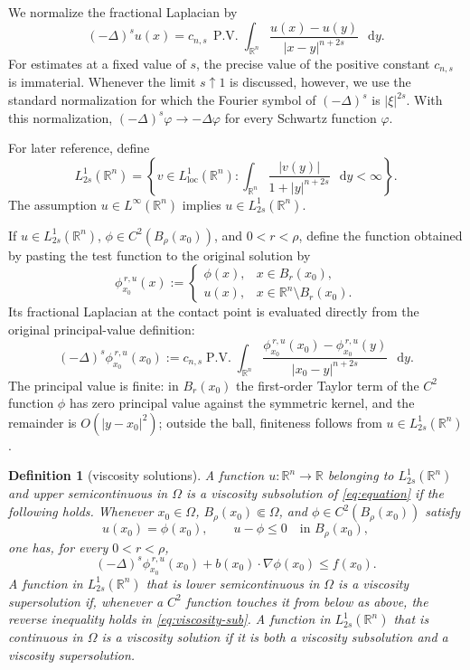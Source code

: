 \documentclass[10pt,a4paper]{amsart}
\numberwithin{equation}{section}
\newtheorem{definition}[theorem]{Definition}
\newcommand{\R}{\mathbb R}
\newcommand{\differential}{\mathop{}\!\mathrm d}
\begin{document}
We normalize the fractional Laplacian by
\begin{equation}\label{eq:frac-lap}
 (-\Delta)^s u(x)=c_{n,s}\,\operatorname{P.V.}
 \int_{\R^n}\frac{u(x)-u(y)}{|x-y|^{n+2s}}\,\differential y.
\end{equation}
For estimates at a fixed value of $s$, the precise value of the positive
constant $c_{n,s}$ is immaterial.  Whenever the limit $s\uparrow1$ is
discussed, however, we use the standard normalization for which the Fourier
symbol of $(-\Delta)^s$ is $|\xi|^{2s}$.  With this normalization,
$(-\Delta)^s\varphi\to-\Delta\varphi$ for every Schwartz function
$\varphi$.

For later reference, define
\[
 L^1_{2s}(\R^n)=\left\{v\in L^1_{\mathrm{loc}}(\R^n):
 \int_{\R^n}\frac{|v(y)|}{1+|y|^{n+2s}}\,\differential y<\infty\right\}.
\]
The assumption $u\in L^\infty(\R^n)$ implies $u\in L^1_{2s}(\R^n)$.

If $u\in L^1_{2s}(\R^n)$, $\phi\in C^2(B_\rho(x_0))$, and
$0<r<\rho$, define the function obtained by pasting the test function to
the original solution by
\begin{equation}\label{eq:pasted-test}
 \phi^{\,r,u}_{x_0}(x):=
 \begin{cases}
  \phi(x),&x\in B_r(x_0),\\
  u(x),&x\in\R^n\setminus B_r(x_0).
 \end{cases}
\end{equation}
Its fractional Laplacian at the contact point is evaluated directly from
the original principal-value definition:
\begin{equation}\label{eq:pasted-fractional-laplacian}
 (-\Delta)^s\phi^{\,r,u}_{x_0}(x_0)
 :=c_{n,s}\operatorname{P.V.}\int_{\R^n}
 \frac{\phi^{\,r,u}_{x_0}(x_0)-\phi^{\,r,u}_{x_0}(y)}
 {|x_0-y|^{n+2s}}\,\differential y.
\end{equation}
The principal value is finite: in $B_r(x_0)$ the first-order Taylor term
of the $C^2$ function $\phi$ has zero principal value against the symmetric
kernel, and the remainder is $O(|y-x_0|^2)$; outside the ball, finiteness
follows from $u\in L^1_{2s}(\R^n)$.

\begin{definition}[viscosity solutions]\label{def:viscosity}
A function $u:\R^n\to\R$ belonging to $L^1_{2s}(\R^n)$ and upper
semicontinuous in $\Omega$ is a viscosity
subsolution of \eqref{eq:equation} if the following holds.  Whenever
$x_0\in\Omega$, $B_\rho(x_0)\Subset\Omega$, and
$\phi\in C^2(B_\rho(x_0))$ satisfy
\[
 u(x_0)=\phi(x_0),\qquad
 u-\phi\le0\quad\text{in }B_\rho(x_0),
\]
one has, for every $0<r<\rho$,
\begin{equation}\label{eq:viscosity-sub}
 (-\Delta)^s\phi^{\,r,u}_{x_0}(x_0)
 +b(x_0)\cdot\nabla\phi(x_0)\le f(x_0).
\end{equation}
A function in $L^1_{2s}(\R^n)$ that is lower semicontinuous in $\Omega$ is
a viscosity supersolution if, whenever a $C^2$ function touches it from
below as above, the reverse inequality holds in
\eqref{eq:viscosity-sub}.  A function in $L^1_{2s}(\R^n)$ that is continuous
in $\Omega$ is a viscosity solution if it is both a viscosity subsolution
and a viscosity supersolution.
\end{definition}
\end{document}

